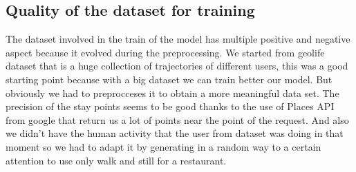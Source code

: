 \documentclass[../../main]{subfiles}
\begin{document}
\subsection{Quality of the dataset for training}
\label{ss:quality-training-dataset}

The dataset involved in the train of the model has multiple positive and negative aspect because it evolved during the preprocessing.
We started from geolife dataset that is a huge collection of trajectories of different users, this was a good starting point 
because with a big dataset we can train better our model. But obviously we had to preprocceses it to obtain a more meaningful data set. 
The precision of the stay points seems to be good thanks to the use of Places API from google that return us a lot of points near the point of the request.
And also we didn't have the human activity that the user from dataset was doing in that moment so we had to adapt it by generating in a random way to a certain
attention to use only walk and still for a restaurant.
\end{document}

